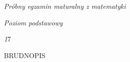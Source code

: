 \documentclass[a4paper,12pt]{article}
\begin{document}
{\it Próbny egzamin maturalny z matematyki}

{\it Poziom podstawowy}

{\it 1}7

BRUDNOPIS
\end{document}
